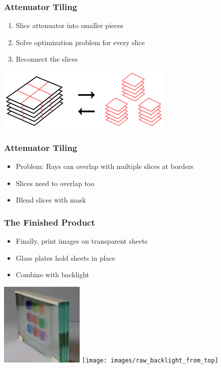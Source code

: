 \documentclass[12pt, compress]{beamer}
\begin{document}
\begin{frame}[fragile]
	\frametitle{Attenuator Tiling}
	
	\begin{enumerate}
		\item Slice attenuator into smaller pieces
		\item Solve optimization problem for every slice
		\item Reconnect the slices
	\end{enumerate}
	
	\vspace{1cm}
	
	\begin{center}
		\includegraphics[height = 3cm]{figures/slicing_attenuator/tiling_overview.pdf}
	\end{center}
\end{frame}

\begin{frame}[fragile]
	\frametitle{Attenuator Tiling}

	\begin{itemize}
		\item Problem: Rays can overlap with multiple slices at borders
		\item Slices need to overlap too
		\item Blend slices with mask
	\end{itemize}
\end{frame}

\begin{frame}[fragile]
	\frametitle{The Finished Product}
	
	\begin{itemize}
		\item Finally, print images on transparent sheets
		\item Glass plates hold sheets in place
		\item Combine with backlight
	\end{itemize}
	
	\begin{center}
		\includegraphics[height=4cm]{images/glass_plates_front_view_cropped}
		\hspace{1cm}
		\texttt{[image: images/raw\_backlight\_from\_top]}
	\end{center}
\end{frame}
\end{document}
